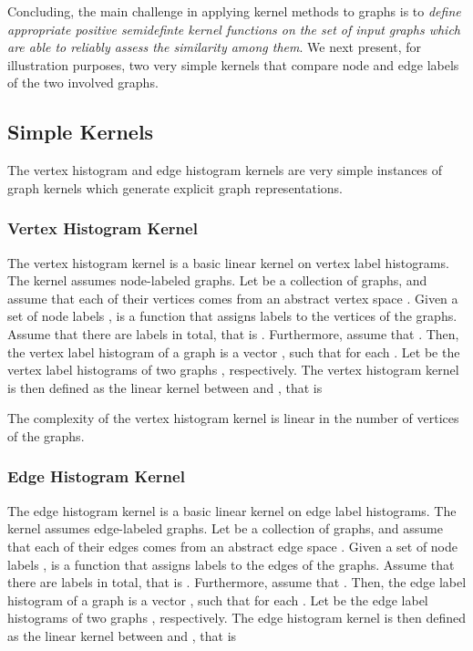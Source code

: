 \documentclass[twoside,11pt]{article}
\begin{document}
Concluding, the main challenge in applying kernel methods to graphs is  to \textit{define appropriate positive semidefinte kernel functions on the set of input graphs which are able to reliably assess the similarity among them}.
We next present, for illustration purposes, two very simple kernels that compare node and edge labels of the two involved graphs.

\subsection{Simple Kernels}
The vertex histogram and edge histogram kernels are very simple instances of graph kernels which generate explicit graph representations.

\subsubsection{Vertex Histogram Kernel}
The vertex histogram kernel is a basic linear kernel on vertex label histograms.
The kernel assumes node-labeled graphs.
Let  be a collection of graphs, and assume that each of their vertices comes from an abstract vertex space .
Given a set of node labels ,  is a function that assigns labels to the vertices of the graphs.
Assume that there are  labels in total, that is .
Furthermore, assume that .
Then, the vertex label histogram of a graph  is a vector , such that  for each .
Let  be the vertex label histograms of two graphs , respectively.
The vertex histogram kernel is then defined as the linear kernel between  and , that is

The complexity of the vertex histogram kernel is linear in the number of vertices of the graphs.

\subsubsection{Edge Histogram Kernel}
The edge histogram kernel is a basic linear kernel on edge label histograms.
The kernel assumes edge-labeled graphs.
Let  be a collection of graphs, and assume that each of their edges comes from an abstract edge space .
Given a set of node labels ,  is a function that assigns labels to the edges of the graphs.
Assume that there are  labels in total, that is .
Furthermore, assume that .
Then, the edge label histogram of a graph  is a vector , such that  for each .
Let  be the edge label histograms of two graphs , respectively.
The edge histogram kernel is then defined as the linear kernel between  and , that is
\end{document}

